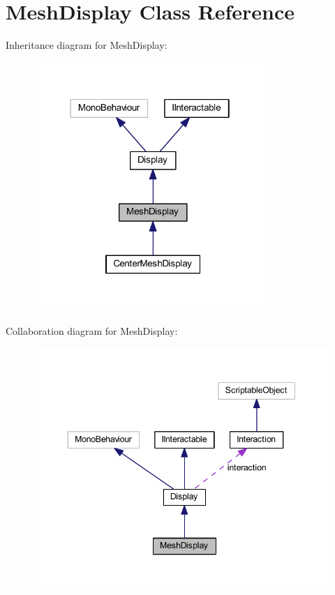 \hypertarget{class_mesh_display}{}\section{Mesh\+Display Class Reference}
\label{class_mesh_display}


Inheritance diagram for Mesh\+Display\+:
\nopagebreak
\begin{figure}[H]
\begin{center}
\leavevmode
\includegraphics[width=250pt]{class_mesh_display__inherit__graph}
\end{center}
\end{figure}


Collaboration diagram for Mesh\+Display\+:
\nopagebreak
\begin{figure}[H]
\begin{center}
\leavevmode
\includegraphics[width=344pt]{class_mesh_display__coll__graph}
\end{center}
\end{figure}
